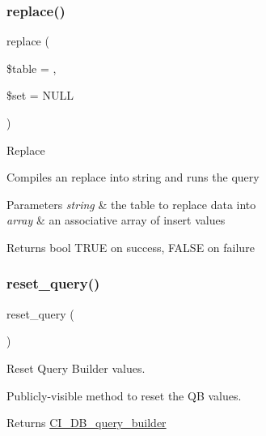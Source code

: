 \subsubsection{\texorpdfstring{replace()}{replace()}}
{\footnotesize\ttfamily replace (\begin{DoxyParamCaption}\item[{}]{\$table = {\ttfamily \textquotesingle{}\textquotesingle{}},  }\item[{}]{\$set = {\ttfamily NULL} }\end{DoxyParamCaption})}

Replace

Compiles an replace into string and runs the query


\begin{DoxyParams}{Parameters}
{\em string} & the table to replace data into \\
\hline
{\em array} & an associative array of insert values \\
\hline
\end{DoxyParams}
\begin{DoxyReturn}{Returns}
bool T\+R\+UE on success, F\+A\+L\+SE on failure 
\end{DoxyReturn}
\mbox{\label{class_c_i___d_b__query__builder_a66636a017a1115d983424cdfca677ddf}} 
\subsubsection{\texorpdfstring{reset\+\_\+query()}{reset\_query()}}
{\footnotesize\ttfamily reset\+\_\+query (\begin{DoxyParamCaption}{ }\end{DoxyParamCaption})}

Reset Query Builder values.

Publicly-\/visible method to reset the QB values.

\begin{DoxyReturn}{Returns}
\mbox{\hyperlink{class_c_i___d_b__query__builder}{C\+I\+\_\+\+D\+B\+\_\+query\+\_\+builder}} 
\end{DoxyReturn}
\mbox{\label{class_c_i___d_b__query__builder_a406a7ea81e717e56496f61baf3e03f44}} 
